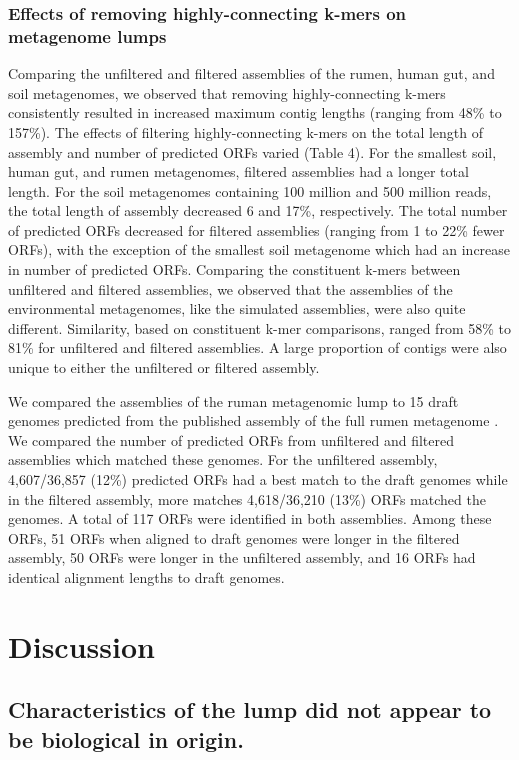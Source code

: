 \documentclass[11pt]{article} %
\begin{document}
\subsubsection{Effects of removing highly-connecting k-mers on metagenome lumps}
Comparing the unfiltered and filtered assemblies of the rumen, human gut, and soil metagenomes, we observed that removing highly-connecting k-mers consistently resulted in increased maximum contig lengths (ranging from 48\% to 157\%).   The effects of filtering highly-connecting k-mers on the total length of assembly and number of predicted ORFs varied (Table 4).   For the smallest soil, human gut, and rumen metagenomes, filtered assemblies had a longer total length.  For the soil metagenomes containing 100 million and 500 million reads, the total length of assembly decreased 6 and 17\%, respectively.  The total number of predicted ORFs decreased for filtered assemblies (ranging from 1 to 22\% fewer ORFs), with the exception of the smallest soil metagenome which had an increase in number of predicted ORFs.  Comparing the constituent k-mers between unfiltered and filtered assemblies, we observed that the assemblies of the environmental metagenomes, like the simulated assemblies, were also quite different.  Similarity, based on constituent k-mer comparisons, ranged from 58\% to 81\% for unfiltered and filtered assemblies.   A large proportion of contigs were also unique to either the unfiltered or filtered assembly.

We compared the assemblies of the ruman metagenomic lump to 15 draft genomes predicted from the published assembly of the full rumen metagenome \cite{Hess:2011p686}.  We compared the number of predicted ORFs from unfiltered and filtered assemblies which matched these genomes.  For the unfiltered assembly, 4,607/36,857 (12\%) predicted ORFs had a best match to the draft genomes while in the filtered assembly, more matches 4,618/36,210 (13\%) ORFs matched the genomes.  A total of 117 ORFs were identified in both assemblies.  Among these ORFs, 51 ORFs when aligned to draft genomes were longer in the filtered assembly, 50 ORFs were longer in the unfiltered assembly, and 16 ORFs had identical alignment lengths to draft genomes.  

\section{Discussion}

\subsection{Characteristics of the lump did not appear to be biological in origin.}
\end{document}
